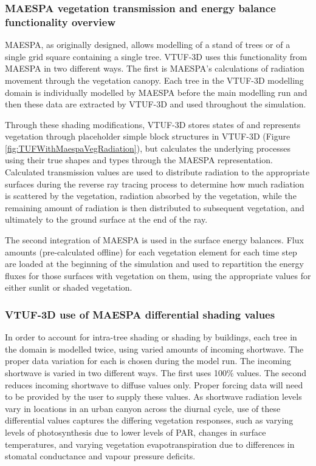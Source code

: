 \documentclass[final,3p,times,authoryear]{elsarticle}
\begin{document}
\subsubsection{MAESPA vegetation transmission and energy balance functionality overview}\label{sec:MAETrans}

MAESPA, as originally designed, allows modelling of a stand of trees or of a single grid square containing a single tree. VTUF-3D uses this functionality from MAESPA in two different ways. The first is MAESPA's calculations of radiation movement through the vegetation canopy. Each tree in the VTUF-3D modelling domain is individually modelled by MAESPA before the main modelling run and then these data are extracted by VTUF-3D and used throughout the simulation. 


Through these shading modifications, VTUF-3D stores states of and represents vegetation through placeholder simple block structures in VTUF-3D (Figure \ref{fig:TUFWithMaespaVegRadiation}), but calculates the underlying processes using their true shapes and types through the MAESPA representation. Calculated transmission values are used to distribute radiation to the appropriate surfaces during the reverse ray tracing process to determine how much radiation is scattered by the vegetation, radiation absorbed by the vegetation, while the remaining amount of radiation is then distributed to subsequent vegetation, and ultimately to the ground surface at the end of the ray. 

The second integration of MAESPA is used in the surface energy balances. Flux amounts (pre-calculated offline) for each vegetation element for each time step are loaded at the beginning of the simulation and used to repartition the energy fluxes for those surfaces with vegetation on them, using the appropriate values for either sunlit or shaded vegetation. 


\subsubsection{VTUF-3D use of MAESPA differential shading values}\label{sec:4diffshading}

In order to account for intra-tree shading or shading by buildings, each tree in the domain is modelled twice, using varied amounts of incoming shortwave. The proper data variation for each is chosen during the model run. The incoming shortwave is varied in two different ways. The first uses 100\% values. The second reduces incoming shortwave to diffuse values only. Proper forcing data will need to be provided by the user to supply these values. As shortwave radiation levels vary in locations in an urban canyon across the diurnal cycle, use of these differential values captures the differing vegetation responses, such as varying levels of photosynthesis due to lower levels of PAR, changes in surface temperatures, and varying vegetation evapotranspiration due to differences in stomatal conductance and vapour pressure deficits.
\end{document}
